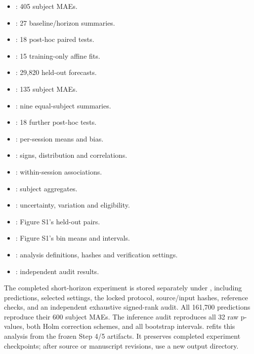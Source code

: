\documentclass[a4paper,10pt,onecolumn]{IEEEtran}
\begin{document}
\begin{itemize}
\item {}: 405 subject MAEs.
\item {}: 27 baseline/horizon summaries.
\item {}: 18 post-hoc paired tests.
\item {}: 15 training-only affine fits.
\item {}: 29,820 held-out forecasts.
\item {}: 135 subject MAEs.
\item {}: nine equal-subject summaries.
\item {}: 18 further post-hoc tests.
\item {}: per-session means and bias.
\item {}: signs, distribution and correlations.
\item {}: within-session associations.
\item {}: subject aggregates.
\item {}: uncertainty, variation and eligibility.
\item {}: Figure S1's held-out pairs.
\item {}: Figure S1's bin means and intervals.
\item {}: analysis definitions,
hashes and verification settings.
\item {}: independent audit results.
\end{itemize}

The completed short-horizon experiment is stored separately under
, including predictions,
selected settings, the locked protocol, source/input hashes, reference checks,
and an independent exhaustive signed-rank audit. All 161,700 predictions
reproduce their 600 subject MAEs. The inference audit reproduces all 32 raw
p-values, both Holm correction schemes, and all bootstrap intervals.
 refits this analysis from the
frozen Step 4/5 artifacts. It preserves completed experiment checkpoints;
after source or manuscript revisions, use a new output directory.
\end{document}
